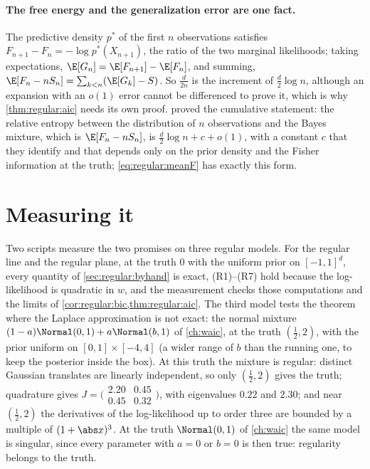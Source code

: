 \begin{refsection}
\paragraph{The free energy and the generalization error are one fact.} The predictive density $p^*$ of the first $n$ observations satisfies $F_{n+1}-F_n=-\log p^*(X_{n+1})$, the ratio of the two marginal likelihoods; taking expectations, $\E[G_n]=\E[F_{n+1}]-\E[F_n]$, and summing, $\E[F_n-nS_n]=\sum_{k<n}(\E[G_k]-S)$. So $\frac d{2n}$ is the increment of $\frac d2\log n$, although an expansion with an $o(1)$ error cannot be differenced to prove it, which is why \cref{thm:regular:aic} needs its own proof. \Textcite{ClarkeBarron1990} proved the cumulative statement: the relative entropy between the distribution of $n$ observations and the Bayes mixture, which is $\E[F_n-nS_n]$, is $\frac d2\log n+c+o(1)$, with a constant $c$ that they identify and that depends only on the prior density and the Fisher information at the truth; \eqref{eq:regular:meanF} has exactly this form.

\section{Measuring it}\label{sec:regular:measuring}

Two scripts measure the two promises on three regular models. For the regular line and the regular plane, at the truth $0$ with the uniform prior on $[-1,1]^d$, every quantity of \cref{sec:regular:byhand} is exact, (R1)--(R7) hold because the log-likelihood is quadratic in $w$, and the measurement checks those computations and the limits of \cref{cor:regular:bic,thm:regular:aic}. The third model tests the theorem where the Laplace approximation is not exact: the normal mixture $(1-a)\Normal(0,1)+a\Normal(b,1)$ of \cref{ch:waic}, at the truth $(\frac12,2)$, with the prior uniform on $[0,1]\times[-4,4]$ (a wider range of $b$ than the running one, to keep the posterior inside the box). At this truth the mixture is regular: distinct Gaussian translates are linearly independent, so only $(\frac12,2)$ gives the truth; quadrature gives $J=\bigl(\begin{smallmatrix}2.20&0.45\\0.45&0.32\end{smallmatrix}\bigr)$, with eigenvalues $0.22$ and $2.30$; and near $(\frac12,2)$ the derivatives of the log-likelihood up to order three are bounded by a multiple of $(1+\abs x)^3$. At the truth $\Normal(0,1)$ of \cref{ch:waic} the same model is singular, since every parameter with $a=0$ or $b=0$ is then true: regularity belongs to the truth.


\end{refsection}

